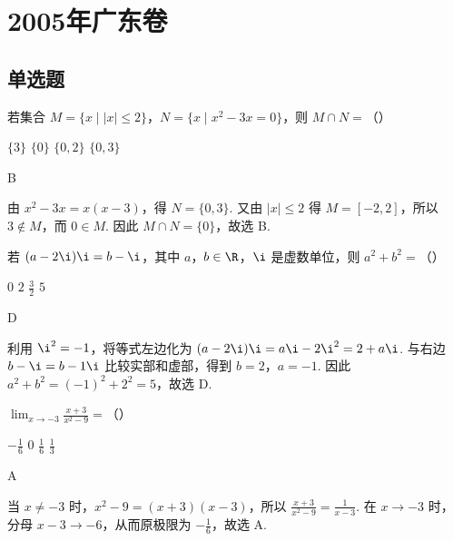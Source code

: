 \chapter{2005年广东卷}
\section{单选题}
\begin{problem}
若集合 \(M = \{x \mid |x| \leqslant 2\}\)，\(N = \{x \mid x^2 - 3x = 0\}\)，则 \(M \cap N =\)（\quad）

\choices
    {\(\{3\}\)}
    {\(\{0\}\)}
    {\(\{0,2\}\)}
    {\(\{0,3\}\)}
\end{problem}

\begin{answer}
B
\end{answer}

\begin{solution}
由 \(x^2-3x=x(x-3)\)，得 \(N=\{0,3\}\). 又由 \(|x|\leqslant2\) 得 \(M=[-2,2]\)，所以 \(3\notin M\)，而 \(0\in M\). 因此 \(M\cap N=\{0\}\)，故选 B.
\end{solution}

\begin{problem}
若 \((a - 2\i)\i = b - \i\)，其中 \(a\)，\(b \in \R\)，\(\i\) 是虚数单位，则 \(a^2 + b^2 =\)（\quad）

\choices
    {\(0\)}
    {\(2\)}
    {\( \frac{3}{2} \)}
    {\(5\)}
\end{problem}

\begin{answer}
D
\end{answer}

\begin{solution}
利用 \(\i^2=-1\)，将等式左边化为 \((a-2\i)\i=a\i-2\i^2=2+a\i\). 与右边 \(b-\i=b-1\i\) 比较实部和虚部，得到 \(b=2\)，\(a=-1\). 因此 \(a^2+b^2=(-1)^2+2^2=5\)，故选 D.
\end{solution}

\begin{problem}
\(\displaystyle\lim_{x\to -3}\frac{x + 3}{x^2 - 9} =\)（\quad）

\choices
    {\(-\frac{1}{6}\)}
    {\(0\)}
    {\(\frac{1}{6}\)}
    {\( \frac{1}{3} \)}
\end{problem}

\begin{answer}
A
\end{answer}

\begin{solution}
当 \(x\ne-3\) 时，\(x^2-9=(x+3)(x-3)\)，所以 \(\frac{x+3}{x^2-9}=\frac{1}{x-3}\). 在 \(x\to-3\) 时，分母 \(x-3\to-6\)，从而原极限为 \(-\frac{1}{6}\)，故选 A.
\end{solution}

